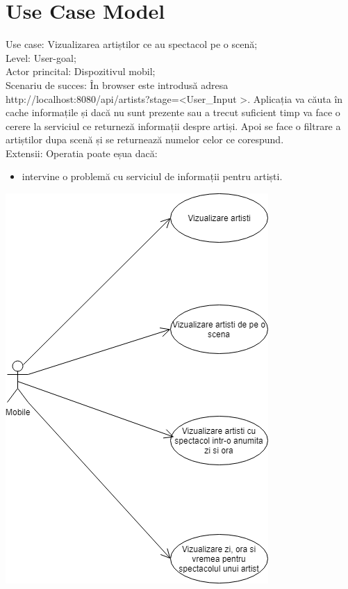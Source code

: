 \documentclass[11pt,a4paper,twoside,notitlepage]{article}
\begin{document}
\section{Use Case Model}

Use case: Vizualizarea artiștilor ce au spectacol pe o scenă; \\
Level: User-goal; \\
Actor princital: Dispozitivul mobil; \\
Scenariu de succes: În browser este introdusă adresa \\ http://localhost:8080/api/artists?stage=\textless User\_Input \textgreater. Aplicația va căuta în cache informațile și dacă nu sunt prezente sau a trecut suficient timp va face o cerere la serviciul ce returneză informații despre artiși. Apoi se face o filtrare a artiștilor dupa scenă și se returnează numelor celor ce corespund. \\
Extensii: Operatia poate eșua dacă:
\begin{itemize}
	\item intervine o problemă cu serviciul de informații pentru artiști.
\end{itemize}

\includegraphics[height=.5\textheight]{useCases}
\end{document}
